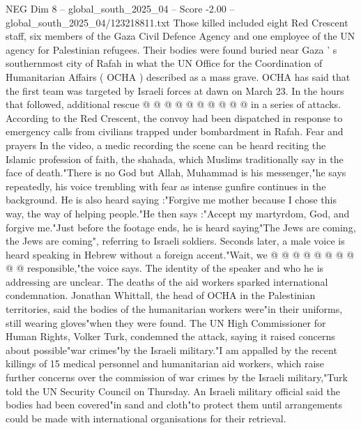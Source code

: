 \begin{textsample}{NEG Dim 8 – global\_south\_2025\_04 – Score -2.00 – global\_south\_2025\_04/123218811.txt}
Those killed included eight Red Crescent staff, six members of the Gaza Civil Defence Agency and one employee of the UN agency for Palestinian refugees.
Their bodies were found buried near Gaza ' s southernmost city of Rafah in what the UN Office for the Coordination of Humanitarian Affairs ( OCHA ) described as a mass grave.
OCHA has said that the first team was targeted by Israeli forces at dawn on March 23.
In the hours that followed, additional rescue @ @ @ @ @ @ @ @ @ @ in a series of attacks.
According to the Red Crescent, the convoy had been dispatched in response to emergency calls from civilians trapped under bombardment in Rafah.
Fear and prayers In the video, a medic recording the scene can be heard reciting the Islamic profession of faith, the shahada, which Muslims traditionally say in the face of death."There is no God but Allah, Muhammad is his messenger,"he says repeatedly, his voice trembling with fear as intense gunfire continues in the background.
He is also heard saying :"Forgive me mother because I chose this way, the way of helping people."He then says :"Accept my martyrdom, God, and forgive me."Just before the footage ends, he is heard saying"The Jews are coming, the Jews are coming", referring to Israeli soldiers.
Seconds later, a male voice is heard speaking in Hebrew without a foreign accent."Wait, we @ @ @ @ @ @ @ @ @ @ responsible,"the voice says.
The identity of the speaker and who he is addressing are unclear.
The deaths of the aid workers sparked international condemnation.
Jonathan Whittall, the head of OCHA in the Palestinian territories, said the bodies of the humanitarian workers were"in their uniforms, still wearing gloves"when they were found.
The UN High Commissioner for Human Rights, Volker Turk, condemned the attack, saying it raised concerns about possible"war crimes"by the Israeli military."I am appalled by the recent killings of 15 medical personnel and humanitarian aid workers, which raise further concerns over the commission of war crimes by the Israeli military,"Turk told the UN Security Council on Thursday.
An Israeli military official said the bodies had been covered"in sand and cloth"to protect them until arrangements could be made with international organisations for their retrieval.

\end{textsample}
